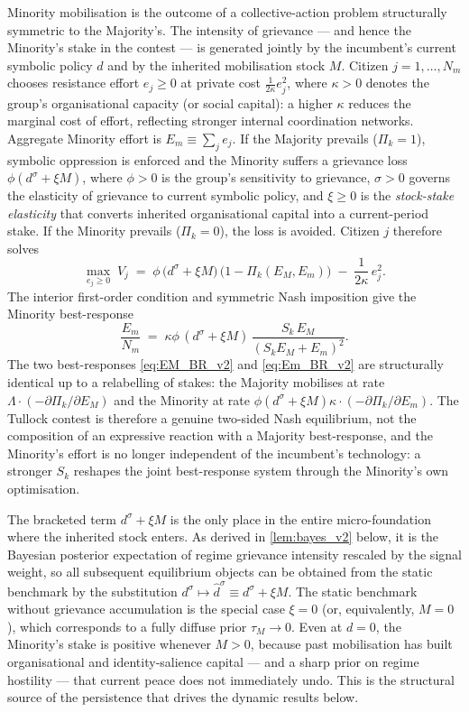 \documentclass[11pt,twoside]{extarticle}
\begin{document}
Minority mobilisation is the outcome of a collective-action problem structurally symmetric to the Majority's. The intensity of grievance — and hence the Minority's stake in the contest — is generated jointly by the incumbent's current symbolic policy $d$ and by the inherited mobilisation stock $M$. Citizen $j=1,\dots,N_m$ chooses resistance effort $e_j\ge 0$ at private cost $\tfrac{1}{2\kappa}e_j^2$, where $\kappa>0$ denotes the group's organisational capacity (or social capital): a higher $\kappa$ reduces the marginal cost of effort, reflecting stronger internal coordination networks. Aggregate Minority effort is $E_m\equiv\sum_j e_j$. If the Majority prevails ($\Pi_k=1$), symbolic oppression is enforced and the Minority suffers a grievance loss $\phi(d^\sigma+\xi M)$, where $\phi>0$ is the group's sensitivity to grievance, $\sigma>0$ governs the elasticity of grievance to current symbolic policy, and $\xi\ge 0$ is the \emph{stock-stake elasticity} that converts inherited organisational capital into a current-period stake. If the Minority prevails ($\Pi_k=0$), the loss is avoided. Citizen $j$ therefore solves
\begin{equation}\label{eq:V_minority_v2}
    \max_{e_j\ge 0}\;V_j\;=\;\phi\,\big(d^\sigma+\xi M\big)\,\bigl(1-\Pi_k(E_M,E_m)\bigr)\;-\;\frac{1}{2\kappa}\,e_j^2.
\end{equation}
The interior first-order condition and symmetric Nash imposition give the Minority best-response
\begin{equation}\label{eq:Em_BR_v2}
    \frac{E_m}{N_m}\;=\;\kappa\phi\,(d^\sigma+\xi M)\,\frac{S_k\,E_M}{(S_k E_M+E_m)^2}.
\end{equation}
The two best-responses \autoref{eq:EM_BR_v2} and \autoref{eq:Em_BR_v2} are structurally identical up to a relabelling of stakes: the Majority mobilises at rate $\Lambda\cdot(-\partial\Pi_k/\partial E_M)$ and the Minority at rate $\phi(d^\sigma+\xi M)\kappa\cdot(-\partial\Pi_k/\partial E_m)$. The Tullock contest is therefore a genuine two-sided Nash equilibrium, not the composition of an expressive reaction with a Majority best-response, and the Minority's effort is no longer independent of the incumbent's technology: a stronger $S_k$ reshapes the joint best-response system through the Minority's own optimisation.

The bracketed term $d^\sigma+\xi M$ is the only place in the entire micro-foundation where the inherited stock enters. As derived in \autoref{lem:bayes_v2} below, it is the Bayesian posterior expectation of regime grievance intensity rescaled by the signal weight, so all subsequent equilibrium objects can be obtained from the static benchmark by the substitution $d^\sigma\mapsto\hat d^\sigma\equiv d^\sigma+\xi M$. The static benchmark without grievance accumulation is the special case $\xi=0$ (or, equivalently, $M=0$), which corresponds to a fully diffuse prior $\tau_M\to 0$. Even at $d=0$, the Minority's stake is positive whenever $M>0$, because past mobilisation has built organisational and identity-salience capital --- and a sharp prior on regime hostility --- that current peace does not immediately undo. This is the structural source of the persistence that drives the dynamic results below.
\end{document}
